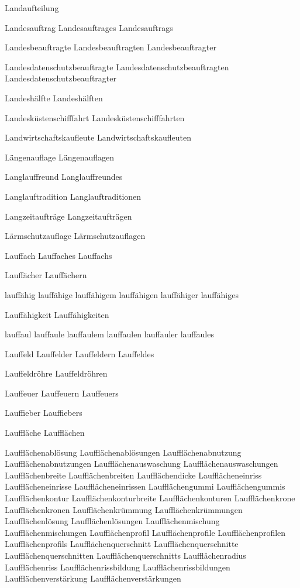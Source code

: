 Landaufteilung

Landesauftrag
Landesauftrages
Landesauftrags

Landesbeauftragte
Landesbeauftragten
Landesbeauftragter

Landesdatenschutzbeauftragte
Landesdatenschutzbeauftragten
Landesdatenschutzbeauftragter

Landeshälfte
Landeshälften

Landesküstenschifffahrt
Landesküstenschifffahrten

Landwirtschaftskaufleute
Landwirtschaftskaufleuten

Längenauflage
Längenauflagen

Langlauffreund
Langlauffreundes

Langlauftradition
Langlauftraditionen

Langzeitaufträge
Langzeitaufträgen

Lärmschutzauflage
Lärmschutzauflagen

Lauffach
Lauffaches
Lauffachs

Lauffächer
Lauffächern

lauffähig
lauffähige
lauffähigem
lauffähigen
lauffähiger
lauffähiges

Lauffähigkeit
Lauffähigkeiten

lauffaul
lauffaule
lauffaulem
lauffaulen
lauffauler
lauffaules


Lauffeld
Lauffelder
Lauffeldern
Lauffeldes

Lauffeldröhre
Lauffeldröhren

Lauffeuer
Lauffeuern
Lauffeuers

Lauffieber
Lauffiebers

Lauffläche
Laufflächen

Laufflächenablösung
Laufflächenablösungen
Laufflächenabnutzung
Laufflächenabnutzungen
Laufflächenauswaschung
Laufflächenauswaschungen
Laufflächenbreite
Laufflächenbreiten
Laufflächendicke
Laufflächeneinriss
Laufflächeneinrisse
Laufflächeneinrissen
Laufflächengummi
Laufflächengummis
Laufflächenkontur
Laufflächenkonturbreite
Laufflächenkonturen
Laufflächenkrone
Laufflächenkronen
Laufflächenkrümmung
Laufflächenkrümmungen
Laufflächenlösung
Laufflächenlösungen
Laufflächenmischung
Laufflächenmischungen
Laufflächenprofil
Laufflächenprofile
Laufflächenprofilen
Laufflächenprofils
Laufflächenquerschnitt
Laufflächenquerschnitte
Laufflächenquerschnitten
Laufflächenquerschnitts
Laufflächenradius
Laufflächenriss
Laufflächenrissbildung
Laufflächenrissbildungen
Laufflächenverstärkung
Laufflächenverstärkungen

